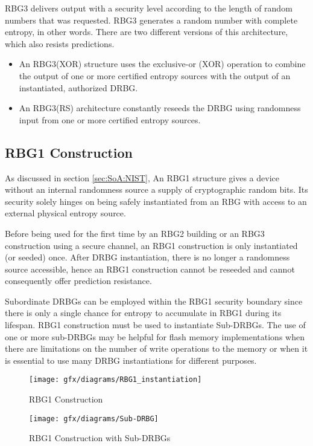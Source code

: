 RBG3 delivers output with a security level according to the length of random numbers that was requested. RBG3 generates a random number with complete entropy, in other words. There are two different versions of this architecture, which also resists predictions.

\begin{itemize}
	\item An RBG3(XOR) structure uses the exclusive-or (XOR) operation to combine the output of one or more certified entropy sources with the output of an instantiated, authorized DRBG.
	\item An RBG3(RS) architecture constantly reseeds the DRBG using randomness input from one or more certified entropy sources.
\end{itemize}

%
%
\subsection{RBG1 Construction}
\label{subsec:SoA:RBG1}
As discussed in section \ref{sec:SoA:NIST}, An RBG1 structure gives a device without an internal randomness source a supply of cryptographic random bits. Its security solely hinges on being safely instantiated from an RBG with access to an external physical entropy source.

Before being used for the first time by an RBG2 building or an RBG3 construction using a secure channel, an RBG1 construction is only instantiated (or seeded) once. After DRBG instantiation, there is no longer a randomness source accessible, hence an RBG1 construction cannot be reseeded and cannot consequently offer prediction resistance.

Subordinate DRBGs can be employed within the RBG1 security boundary since there is only a single chance for entropy to accumulate in RBG1 during its lifespan. RBG1 construction must be used to instantiate Sub-DRBGs. The use of one or more sub-DRBGs may be helpful for flash memory implementations when there are limitations on the number of write operations to the memory or when it is essential to use many DRBG instantiations for different purposes.
\begin{figure}[htbp]
	\centering
	\texttt{[image: gfx/diagrams/RBG1\_instantiation]}
	\caption{RBG1 Construction}
	\label{fig:3:1}
\end{figure}
\begin{figure}[htbp]
	\centering
	\texttt{[image: gfx/diagrams/Sub-DRBG]}
	\caption{RBG1 Construction with Sub-DRBGs}
	\label{fig:3:2}
\end{figure}

